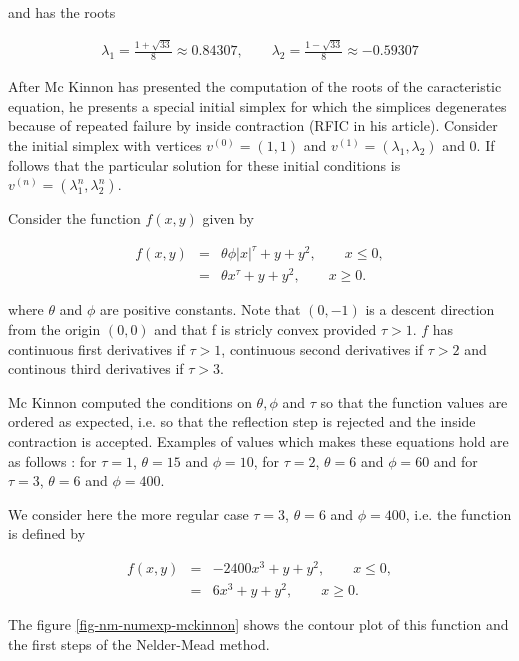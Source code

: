 and has the roots 

\begin{eqnarray}
\label{mckinnon-roots}
\lambda_1 = \frac{1 + \sqrt{33}}{8}\approx 0.84307, 
\qquad \lambda_2 = \frac{1 - \sqrt{33}}{8} \approx -0.59307
\end{eqnarray}

After Mc Kinnon has presented the computation of the roots of the 
caracteristic equation, he presents a special initial simplex 
for which the simplices degenerates because of repeated failure by inside 
contraction (RFIC in his article). Consider the initial simplex with
vertices $v^{(0)} = (1,1)$ and $v^{(1)} = (\lambda_1,\lambda_2)$ and 
$0$. If follows that the particular solution for these initial 
conditions is $v^{(n)} = (\lambda_1^n,\lambda_2^n)$.

Consider the function $f(x,y)$ given by 

\begin{eqnarray}
\label{mckinnon-function}
f(x,y) &=& \theta \phi |x|^\tau + y + y^2, \qquad x\leq 0,\\
&=&\theta x^\tau + y + y^2, \qquad x\geq 0.
\end{eqnarray}

where $\theta$ and $\phi$ are positive constants. Note that $(0,-1)$
is a descent direction from the origin $(0,0)$ and that f is stricly convex 
provided $\tau>1$. $f$ has continuous first derivatives if $\tau>1$, continuous second 
derivatives if $\tau>2$ and continous third derivatives if $\tau>3$.

Mc Kinnon computed the conditions on $\theta,\phi$ and $\tau$
so that the function values are ordered as expected, i.e. so that the 
reflection step is rejected and the inside contraction is accepted.
Examples of values which makes these equations hold are as follows :
for $\tau=1$, $\theta=15$ and $\phi = 10$, 
for $\tau=2$, $\theta=6$ and $\phi = 60$ and
for $\tau=3$, $\theta=6$ and $\phi = 400$.

We consider here the more regular case $\tau=3$, $\theta=6$
and $\phi = 400$, i.e. the function is defined by 

\begin{eqnarray}
\label{mckinnon-function3}
f(x,y) &=& - 2400 x^3 + y + y^2, \qquad x\leq 0, \\
&=& 6 x^3 + y + y^2, \qquad x\geq 0.
\end{eqnarray}

The figure \ref{fig-nm-numexp-mckinnon} shows the contour plot of this function and the first 
steps of the Nelder-Mead method.


